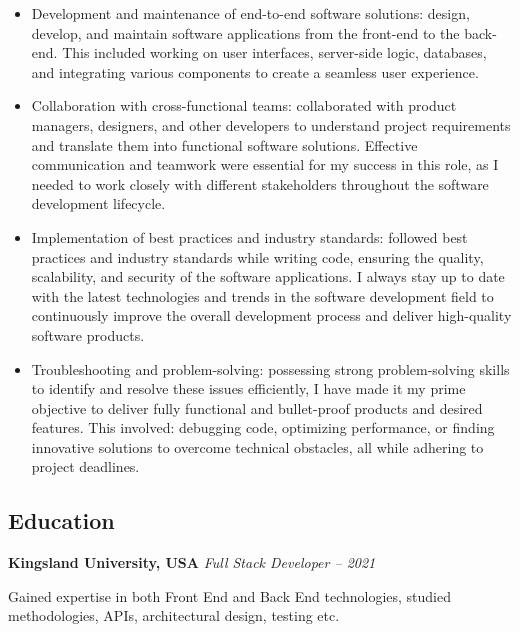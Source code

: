 \documentclass[11pt, oneside]{article}
\begin{document}
\begin{itemize} 
  \item Development and maintenance of end-to-end software solutions: design, develop, and maintain software applications from the front-end to the back-end. This included working on user interfaces, server-side logic, databases, and integrating various components to create a seamless user experience.
  \item Collaboration with cross-functional teams: collaborated with product managers, designers, and other developers to understand project requirements and translate them into functional software solutions. Effective communication and teamwork were essential for my success in this role, as I needed to work closely with different stakeholders throughout the software development lifecycle.
  \item Implementation of best practices and industry standards: followed best practices and industry standards while writing code, ensuring the quality, scalability, and security of the software applications. I always stay up to date with the latest technologies and trends in the software development field to continuously improve the overall development process and deliver high-quality software products.
  \item Troubleshooting and problem-solving: possessing strong problem-solving skills to identify and resolve these issues efficiently, I have made it my prime objective to deliver fully functional and bullet-proof products and desired features. This involved: debugging code, optimizing performance, or finding innovative solutions to overcome technical obstacles, all while adhering to project deadlines.
  
\end{itemize}

\medskip

\subsection*{Education}
\textbf{Kingsland University, USA}
\hfill
\textit{Full Stack Developer – 2021}

Gained expertise in both Front End and Back End technologies, studied methodologies, APIs, architectural design, testing etc.
\end{document}
